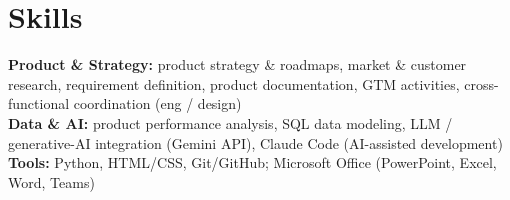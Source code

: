\documentclass[10pt,letterpaper]{article}
\begin{document}
\section*{Skills}
\textbf{Product \& Strategy:} product strategy \& roadmaps, market \& customer research, requirement definition, product documentation, GTM activities, cross-functional coordination (eng / design)\\[2pt]
\textbf{Data \& AI:} product performance analysis, SQL data modeling, LLM / generative-AI integration (Gemini API), Claude Code (AI-assisted development)\\[2pt]
\textbf{Tools:} Python, HTML/CSS, Git/GitHub; Microsoft Office (PowerPoint, Excel, Word, Teams)
\end{document}
